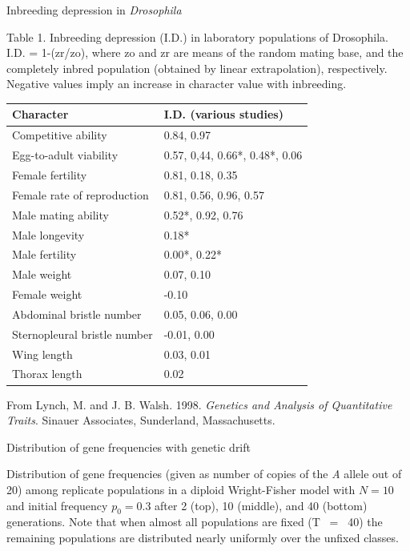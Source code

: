\documentclass[bluish,slideColor,colorBG,pdf]{prosper}
\begin{document}
\begin{slide}[Replace]{Inbreeding depression in {\it Drosophila} }
\vspace{-0.1in}

{
Table 1. Inbreeding depression (I.D.) in laboratory populations of Drosophila.
I.D. = 1-(zr/zo), where zo and zr are means of the random mating base, and the
completely inbred population (obtained by linear extrapolation), respectively.
Negative values imply an
increase in character value with inbreeding.}

{
\renewcommand\arraystretch{0.8}
\begin{tabular}{l l}
  Character                  &     I.D. (various studies)\\
\hline
  Competitive ability        &    0.84, 0.97\\
  Egg-to-adult viability     &    0.57, 0,44, 0.66*, 0.48*, 0.06\\
  Female fertility           &    0.81, 0.18, 0.35\\
  Female rate of reproduction&    0.81, 0.56, 0.96, 0.57\\
  Male mating ability        &    0.52*, 0.92, 0.76\\
  Male longevity             &    0.18*\\
  Male fertility             &    0.00*, 0.22*\\
  Male weight                &    0.07, 0.10\\
  Female weight              &    -0.10\\
  Abdominal bristle number   &    0.05, 0.06, 0.00\\
  Sternopleural bristle number &  -0.01, 0.00\\
  Wing length                  &  0.03, 0.01\\
  Thorax length                &  0.02\\
\end{tabular}

From Lynch, M. and J. B. Walsh. 1998. {\it Genetics and Analysis of
Quantitative Traits}. Sinauer Associates, Sunderland, Massachusetts.
}

\end{slide}

\begin{slide}[Replace]{Distribution of gene frequencies with genetic drift}

\centerline{}
\centerline{}
\centerline{}

\noindent
{Distribution of gene frequencies (given as number of copies of the
{\it A} allele out of 20) among replicate populations in a diploid
Wright-Fisher model with $N = 10$ and initial frequency $p_0  =  0.3$ after
2 (top), 10 (middle), and 40 (bottom) generations.  Note that when almost all
populations are fixed
(T \ = \ 40) the remaining populations are distributed nearly uniformly over
the
unfixed classes.}

\end{slide}
\end{document}
